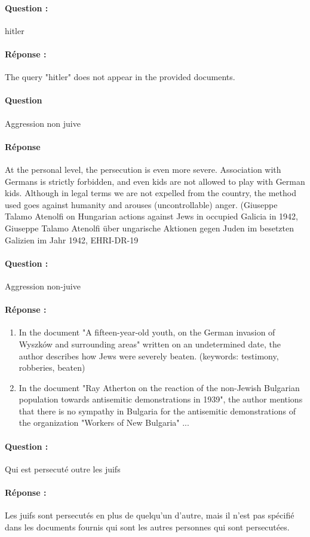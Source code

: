 \separation

\paragraph{Question : } hitler

\paragraph{Réponse : } The query "hitler" does not appear in the provided documents.

\separation

\paragraph{Question}
Aggression non juive

\paragraph{Réponse}
At the personal level, the persecution is even more severe. Association with Germans is strictly forbidden, and even kids are not allowed to play with German kids. Although in legal terms we are not expelled from the country, the method used goes against humanity and arouses (uncontrollable) anger. (Giuseppe Talamo Atenolfi on Hungarian actions against Jews in occupied Galicia in 1942, Giuseppe Talamo Atenolfi über ungarische Aktionen gegen Juden im besetzten Galizien im Jahr 1942, EHRI-DR-19

\separation

\paragraph{Question : } Aggression non-juive

\paragraph{Réponse : }
\begin{enumerate}
    \item In the document "A fifteen-year-old youth, on the German invasion of Wyszków and surrounding areas" written on an undetermined date, the author describes how Jews were severely beaten. (keywords: testimony, robberies, beaten) 
    \item In the document "Ray Atherton on the reaction of the non-Jewish Bulgarian population towards antisemitic demonstrations in 1939", the author mentions that there is no sympathy in Bulgaria for the antisemitic demonstrations of the organization "Workers of New Bulgaria" ...
\end{enumerate}

\separation

\paragraph{Question : } Qui est persecuté outre les juifs

\paragraph{Réponse : } Les juifs sont persecutés en plus de quelqu'un d'autre, mais il n'est pas spécifié dans les documents fournis qui sont les autres personnes qui sont persecutées.